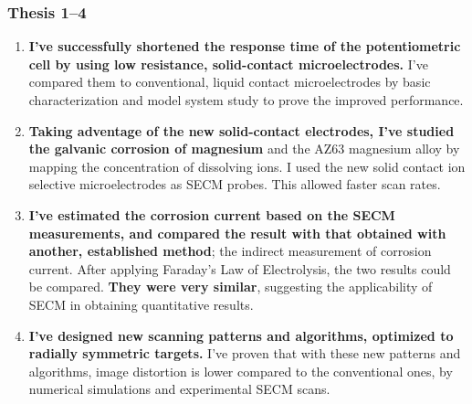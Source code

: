 \documentclass{beamer}
\begin{document}
\begin{frame}
\frametitle{Thesis 1--4}
\scriptsize
\begin{enumerate}
\item \textbf{I've successfully shortened the response time of the potentiometric cell by using low resistance, solid-contact microelectrodes.}
I've compared them to conventional, liquid contact microelectrodes by basic characterization and model system study to prove the improved performance.

\item \textbf{Taking adventage of the new solid-contact electrodes, I've studied the galvanic corrosion of magnesium} and the AZ63 magnesium alloy by mapping the concentration of dissolving ions.
I used the new solid contact ion selective microelectrodes as SECM probes. This allowed faster scan rates.

\item \textbf{I've estimated the corrosion current based on the SECM measurements, and compared the result with that obtained with another, established method}; the indirect measurement of corrosion current.
After applying Faraday's Law of Electrolysis, the two results could be compared.
\textbf{They were very similar}, suggesting the applicability of SECM in obtaining quantitative results.

\item \textbf{I've designed new scanning patterns and algorithms, optimized to radially symmetric targets.}
I've proven that with these new patterns and algorithms, image distortion is lower compared to the conventional ones, by numerical simulations and experimental SECM scans.
\end{enumerate}
\end{frame}
\end{document}
